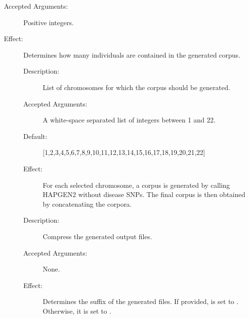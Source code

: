 \documentclass[a4paper,10pt,english]{sphinxhowto}
\begin{document}
\begin{description}
\begin{description}
\begin{description}
\item[{Accepted Arguments:}] \leavevmode
Positive integers.

\item[{Effect:}] \leavevmode
Determines how many individuals are contained in the generated corpus.

\end{description}

\end{description}

\item[{\sphinxstylestrong{Optional Arguments:}}] \leavevmode\begin{description}
\item[{}] \leavevmode\begin{description}
\item[{Description:}] \leavevmode
List of chromosomes for which the corpus should be generated.

\item[{Accepted Arguments:}] \leavevmode
A white-space separated list of integers between 1 and 22.

\item[{Default:}] \leavevmode
{[}1,2,3,4,5,6,7,8,9,10,11,12,13,14,15,16,17,18,19,20,21,22{]}

\item[{Effect:}] \leavevmode
For each selected chromosome, a corpus is generated by calling HAPGEN2 without disease SNPs.
The final corpus is then obtained by concatenating the corpora.

\end{description}

\item[{}] \leavevmode\begin{description}
\item[{Description:}] \leavevmode
Compress the generated output files.

\item[{Accepted Arguments:}] \leavevmode
None.

\item[{Effect:}] \leavevmode
Determines the suffix  of the generated files. If provided,  is set to .
Otherwise, it is set to .


\end{description}
\end{description}
\end{description}
\end{document}
